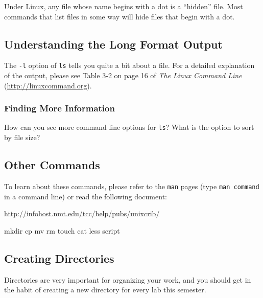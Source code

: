 \documentclass[11pt]{cselabheader}
\begin{document}
Under Linux, any file whose name begins with a dot is a ``hidden'' file. Most
commands that list files in some way will hide files that begin with a dot.

\subsection*{Understanding the Long Format Output}

The \texttt{-l} option of \texttt{ls} tells you quite a bit about a file. For a
detailed explanation of the output, please see Table 3-2 on page 16 of
\textit{The Linux Command Line} (\url{http://linuxcommand.org}).

\subsubsection*{Finding More Information}

How can you see more command line options for \texttt{ls}? What is the option to
sort by file size?

\subsection{Other Commands}

To learn about these commands, please refer to the \texttt{man} pages (type
\texttt{man command} in a command line) or read the following document:
\begin{center}
\url{http://infohost.nmt.edu/tcc/help/pubs/unixcrib/}
\end{center}

\begin{bashcode}
mkdir 
cp
mv
rm
touch
cat
less
script
\end{bashcode}

\subsection{Creating Directories}
Directories are very important for organizing your work, and you should get in
the habit of creating a new directory for every lab this semester.
\end{document}

